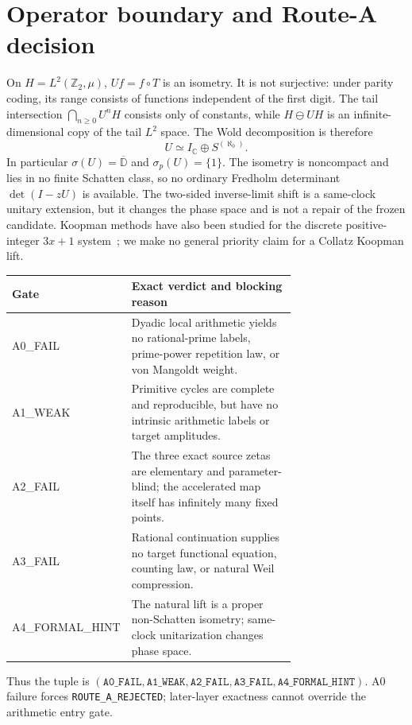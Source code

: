 \documentclass[10pt]{article}
\newcommand{\Ztwo}{\mathbb Z_2}
\begin{document}
\section{Operator boundary and Route-A decision}
On $H=L^2(\Ztwo,\mu)$, $Uf=f\circ T$ is an isometry.  It is not surjective:
under parity coding, its range consists of functions independent of the
first digit.  The tail intersection $\bigcap_{n\ge0}U^nH$ consists only of
constants, while $H\ominus UH$ is an infinite-dimensional copy of the tail
$L^2$ space.  The Wold decomposition is therefore
\begin{equation}\label{eq:wold}
U\simeq I_{\mathbb C}\oplus S^{(\aleph_0)}.
\end{equation}
In particular $\sigma(U)=\overline{\mathbb D}$ and
$\sigma_p(U)=\{1\}$.  The isometry is noncompact and lies in no finite
Schatten class, so no ordinary Fredholm determinant $\det(I-zU)$ is
available.  The two-sided inverse-limit shift is a same-clock unitary
extension, but it changes the phase space and is not a repair of the frozen
candidate.  Koopman methods have also been studied for the discrete
positive-integer $3x+1$ system~\cite{leventides-poulios}; we make no general
priority claim for a Collatz Koopman lift.

\begin{center}
\small
\begin{tabular}{@{}>{\ttfamily}l p{0.71\linewidth}@{}}
\toprule
Gate & Exact verdict and blocking reason \\
\midrule
A0\_FAIL & Dyadic local arithmetic yields no rational-prime labels,
prime-power repetition law, or von Mangoldt weight. \\
A1\_WEAK & Primitive cycles are complete and reproducible, but have no
intrinsic arithmetic labels or target amplitudes. \\
A2\_FAIL & The three exact source zetas are elementary and parameter-blind;
the accelerated map itself has infinitely many fixed points. \\
A3\_FAIL & Rational continuation supplies no target functional equation,
counting law, or natural Weil compression. \\
A4\_FORMAL\_HINT & The natural lift is a proper non-Schatten isometry;
same-clock unitarization changes phase space. \\
\bottomrule
\end{tabular}
\end{center}

Thus the tuple is
$(\texttt{A0\_FAIL},\texttt{A1\_WEAK},\texttt{A2\_FAIL},
\texttt{A3\_FAIL},\texttt{A4\_FORMAL\_HINT})$.
A0 failure forces \texttt{ROUTE\_A\_REJECTED}; later-layer exactness cannot
override the arithmetic entry gate.
\end{document}
